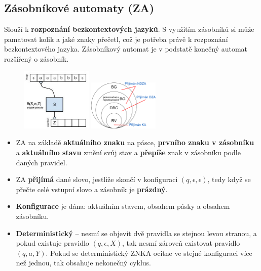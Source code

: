 \subsection{Zásobníkové automaty (ZA)}
Slouží k \textbf{rozpoznání bezkontextových jazyků}. S využitím zásobníků si může pamatovat kolik a jaké znaky přečetl, což je potřeba právě k rozpoznání bezkontextového jazyka. Zásobníkový automat je v podstatě konečný automat rozšířený o zásobník. 

\begin{figure}[H]
	\centering
	\includegraphics[width=0.30\textwidth]{assets/za}
	\includegraphics[width=0.30\textwidth]{assets/cfl}
\end{figure}

\begin{itemize}
\item ZA na základě \textbf{aktuálního znaku} na pásce, \textbf{prvního znaku v zásobníku} a \textbf{aktuálního stavu} změní svůj stav a \textbf{přepíše} znak v zásobníku podle daných pravidel.
\item ZA \textbf{přijímá} dané slovo, jestliže skončí v konfiguraci $(q, \epsilon, \epsilon)$, tedy když se přečte celé vstupní slovo a zásobník je \textbf{prázdný}.
\item \textbf{Konfigurace} je dána: aktuálním stavem, obsahem pásky a obsahem zásobníku.
\item \textbf{Deterministický} -- nesmí se objevit dvě pravidla se stejnou levou stranou, a pokud existuje
pravidlo $(q, \epsilon, X)$, tak nesmí zároveň existovat pravidlo $(q, a, Y)$. Pokud se deterministický ZNKA ocitne
ve stejné konfiguraci více než jednou, tak obsahuje nekonečný cyklus.
\end{itemize}

